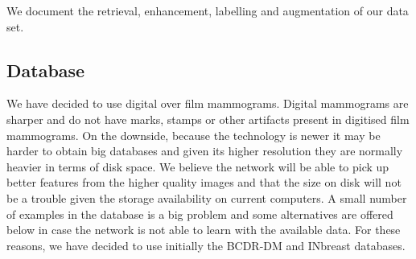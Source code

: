 We document the retrieval, enhancement, labelling and augmentation of our data set.

	\subsection{Database}
We have decided to use digital over film mammograms. Digital mammograms are sharper and do not have marks, stamps or other artifacts present in digitised film mammograms. On the downside, because the technology is newer it may be harder to obtain big databases and given its higher resolution they are normally heavier in terms of disk space. We believe the network will be able to pick up better features from the higher quality images and that the size on disk will not be a trouble given the storage availability on current computers. A small number of examples in the database is a big problem and some alternatives are offered below in case the network is not able to learn with the available data. For these reasons, we have decided to use initially the BCDR-DM and INbreast databases.

	
